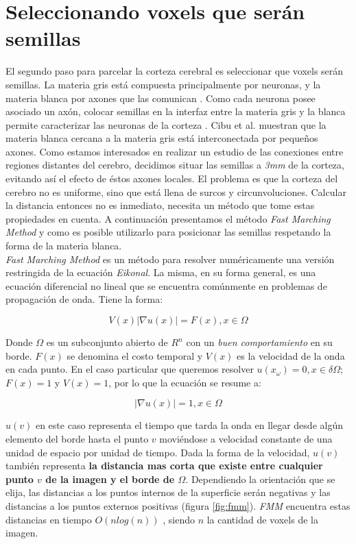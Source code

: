 \section{Seleccionando voxels que ser\'an semillas}
\label{sec:semillas}

El segundo paso para parcelar la corteza cerebral es seleccionar que voxels
ser\'an semillas.
La materia gris est\'a compuesta principalmente por neuronas, y la materia
blanca por axones que las comunican \cite{Dale2008}. Como cada
neurona posee asociado un ax\'on, colocar semillas en la interfaz entre la
materia gris y la blanca permite caracterizar las neuronas de la corteza
\cite{Mori2002} \cite{Anwander2006}. Cibu et al. \cite{Thomas2014} muestran
que la materia blanca cercana a la materia gris est\'a interconectada por
peque\~nos axones. Como estamos interesados en realizar un estudio de las
conexiones entre regiones distantes del cerebro, decidimos situar las
semillas a \textit{3mm} de la corteza, evitando as\'i el efecto de \'estos
axones locales. El problema es que la corteza del cerebro no es uniforme,
sino que est\'a llena de surcos y circunvoluciones. Calcular la distancia
entonces no es inmediato, necesita un m\'etodo que tome estas propiedades
en cuenta. A continuaci\'on presentamos el m\'etodo \textit{Fast Marching
Method} y como es posible utilizarlo para posicionar las semillas
respetando la forma de la materia blanca. \\

\textit{Fast Marching Method} es un m\'etodo para resolver num\'ericamente
una versi\'on restringida de la ecuaci\'on \textit{Eikonal}. La misma, en
su forma general, es una ecuaci\'on diferencial no lineal que se encuentra
com\'unmente en problemas de propagaci\'on de onda. Tiene la forma: 

$$ V(x) | \nabla u(x) | = F(x) , x \in \Omega $$ 

Donde $\Omega$ es un subconjunto abierto de $R^n$ con un \textit{buen
comportamiento} en su borde. $F(x)$ se denomina el costo temporal y $V(x)$
es la velocidad de la onda en cada punto. En el caso particular que
queremos resolver $u(x_\omega) = 0, x \in \delta\Omega$;  $F(x)=1$ y 
$V(x)=1$, por lo que la ecuaci\'on se resume a:

$$ | \nabla u(x) | = 1 , x \in \Omega $$ 

$u(v)$ en este caso representa el tiempo que tarda la onda en llegar desde
alg\'un elemento del borde hasta el punto $v$ movi\'endose a velocidad
constante de una unidad de espacio por unidad de tiempo. Dada la forma de
la velocidad, $u(v)$ tambi\'en representa \textbf{la distancia mas corta
que existe entre cualquier punto $v$ de la imagen y el borde de $\Omega$}.
Dependiendo la orientaci\'on que se elija, las distancias a los puntos
internos de la superficie ser\'an negativas y las distancias a los puntos
externos positivas (figura \ref{fig:fmm}). \textit{FMM} encuentra estas 
distancias en tiempo $O(n log(n))$ \cite{Sethian2001}, siendo $n$ la 
cantidad de voxels de la imagen.\\

